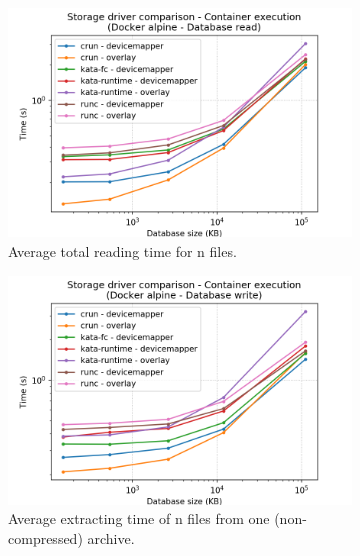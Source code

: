 \begin{figure}[h!]
  
  \begin{subfigure}{.5\textwidth}
    \centering
    \includegraphics[width=\linewidth]{images/runtime/runtime-execution-Docker-alpine---Database-read.png}
    \caption{Average total reading time for n files.}
    \label{fig:runtime:db-read-exec}
  \end{subfigure}
  \begin{subfigure}{.5\textwidth}
    \centering
    \includegraphics[width=\linewidth]{images/runtime/runtime-execution-Docker-alpine---Database-write.png}
    \caption{Average extracting time of n files from one (non-compressed) archive.}
    \label{fig:runtime:db-write-exec}
  \end{subfigure}
    
    \caption{}
    \label{fig:runtime:db}

\end{figure}

